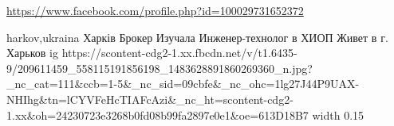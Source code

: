  
 
 
 
 

\url{https://www.facebook.com/profile.php?id=100029731652372}\par
harkov,ukraina
Харків Брокер
Изучала Инженер-технолог в ХИОП
Живет в г. Харьков
\ifcmt
  ig https://scontent-cdg2-1.xx.fbcdn.net/v/t1.6435-9/209611459_558115191856198_1483628891860269360_n.jpg?_nc_cat=111&ccb=1-5&_nc_sid=09cbfe&_nc_ohc=1lg27J44P9UAX-NHIhg&tn=lCYVFeHcTIAFcAzi&_nc_ht=scontent-cdg2-1.xx&oh=24230723e3268b0fd08b99fa2897e0e1&oe=613D18B7
  width 0.15
\fi

